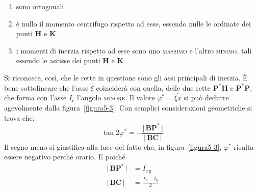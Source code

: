 \begin{enumerate}
\item sono ortogonali
\item è nullo il momento centrifugo rispetto ad esse, essendo nulle le ordinate dei punti $\mathbf{H}$ e $\mathbf{K}$
\item i momenti di inerzia rispetto ad esse sono uno \textsc{massimo} e l'altro \textsc{minimo}, tali essendo le ascisse dei punti $\mathbf{H}$ e $\mathbf{K}$
\end{enumerate}
Si riconosce, così, che le rette in questione sono gli assi principali di inerzia.
È bene sottolineare che l'asse $\xi$ coinciderà con quella, delle due rette $\mathbf{P}^{*}\mathbf{H}$ e $\mathbf{P}^{*}\mathbf{P}$, che forma con l'asse $I_r$ l'angolo \textsc{minore}. Il valore $\varphi^{*}=\widehat{\xi x}$ si può dedurre agevolmente dalla figura~\ref{figura5-3}. Con semplici considerazioni geometriche si trova che:
\begin{equation*}
\tan 2\varphi^{*} = -\frac{\lvert \,\mathbf{B}\mathbf{P}^{*} \,\lvert}{\lvert \,\mathbf{B}\mathbf{C} \,\lvert}
\end{equation*}
Il segno meno si giustifica alla luce del fatto che, in figura~\ref{figura5-3}, $\varphi^{*}$ risulta essere negativo perché orario. E poiché
\begin{align*}
\lvert \, \mathbf{B}\mathbf{P}^{*}\,\lvert &= I_{xy} \\ 
\lvert \, \mathbf{B}\mathbf{C}\,\lvert &= \frac{I_{x}-I_{y}}{2} 
\end{align*}
